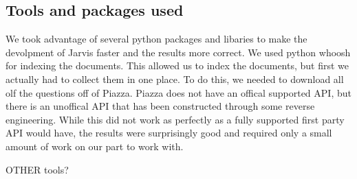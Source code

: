 \documentclass[sigconf]{acmart}
\begin{document}
\subsection{Tools and packages used}
We took advantage of several python packages and libaries to make the devolpment of Jarvis faster and the results more correct. We used python whoosh for indexing the documents. This allowed us to index the documents, but first we actually had to collect them in one place. To do this, we needed to download all olf the questions off of Piazza. Piazza does not have an offical supported API, but there is an unoffical API that has been constructed through some reverse engineering. While this did not work as perfectly as a fully supported first party API would have, the results were surprisingly good and required only a small amount of work on our part to work with.

OTHER tools?

 
\end{document}
